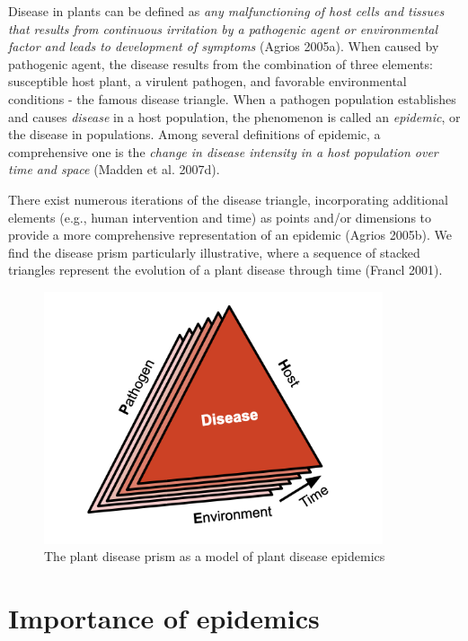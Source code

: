 \documentclass[
  letterpaper,
]{book}
\begin{document}
Disease in plants can be defined as \emph{any malfunctioning of host
cells and tissues that results from continuous irritation by a
pathogenic agent or environmental factor and leads to development of
symptoms} (Agrios 2005a). When caused by pathogenic agent, the disease
results from the combination of three elements: susceptible host plant,
a virulent pathogen, and favorable environmental conditions - the famous
disease triangle. When a pathogen population establishes and causes
\emph{disease} in a host population, the phenomenon is called an
\emph{epidemic}, or the disease in populations. Among several
definitions of epidemic, a comprehensive one is the \emph{change in
disease intensity in a host population over time and space} (Madden et
al. 2007d).

There exist numerous iterations of the disease triangle, incorporating
additional elements (e.g., human intervention and time) as points and/or
dimensions to provide a more comprehensive representation of an epidemic
(Agrios 2005b). We find the disease prism particularly illustrative,
where a sequence of stacked triangles represent the evolution of a plant
disease through time (Francl 2001).

\begin{figure}

{\centering \includegraphics[width=3.92708in,height=\textheight]{imgs/prism.png}

}

\caption{\label{fig-prism}The plant disease prism as a model of plant
disease epidemics}

\end{figure}

\hypertarget{importance-of-epidemics}{%
\section{Importance of epidemics}\label{importance-of-epidemics}}
\end{document}
